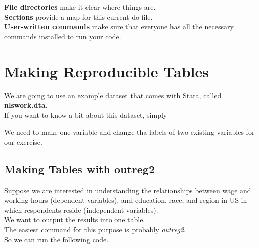 \documentclass[14pt]{article}
\begin{document}
\textbf{File directories} make it clear where things are. \\

\textbf{Sections} provide a map for this current do file. \\

\textbf{User-written commands} make sure that everyone has all the necessary commands installed to run your code.

\newpage
\begin{stlog}\end{stlog}
\newpage
\section{Making Reproducible Tables}

We are going to use an example dataset that comes with Stata, called \textbf{nlswork.dta}. \\

If you want to know a bit about this dataset, simply

\begin{stlog}\end{stlog}
We need to make one variable and change tha labels of two existing variables for our exercise. \\
\begin{stlog}\end{stlog}
\subsection{Making Tables with outreg2}

Suppose we are interested in understanding the relationships between wage and working hours (dependent variables), and education, race, and region in US in which respondents reside (independent variables). \\

We want to output the results into one table. \\

The easiest command for this purpose is probably \textit{outreg2}. \\

So we can run the following code. \\

\begin{stlog}\end{stlog}
\end{document}
